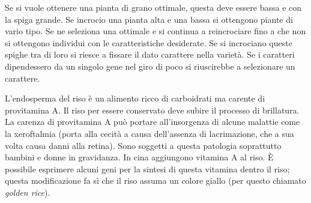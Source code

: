 \documentclass[]{article}
\begin{document}
Se si vuole ottenere una pianta di grano ottimale, questa deve essere
bassa e con la spiga grande. Se incrocio una pianta alta e una bassa si
ottengono piante di vario tipo. Se ne seleziona una ottimale e si
continua a reincrociare fino a che non si ottengono individui con le
caratteristiche desiderate. Se si incrociano queste spighe tra di loro
si riesce a fissare il dato carattere nella varietà. Se i caratteri
dipendessero da un singolo gene nel giro di poco si riuscirebbe a
selezionare un carattere.

L'endosperma del riso è un alimento ricco di carboidrati ma carente di
provitamina A. Il riso per essere conservato deve subire il processo di
brillatura. La carenza di provitamina A può portare all'insorgenza di
alcune malattie come la xeroftalmia (porta alla cecità a causa
dell'assenza di lacrimazione, che a sua volta causa danni alla retina).
Sono soggetti a questa patologia soprattutto bambini e donne in
gravidanza. In cina aggiungono vitamina A al riso. È possibile esprimere
alcuni geni per la sintesi di questa vitamina dentro il riso; questa
modificazione fa sì che il riso assuma un colore giallo (per questo
chiamato \emph{golden rice}).
\end{document}

